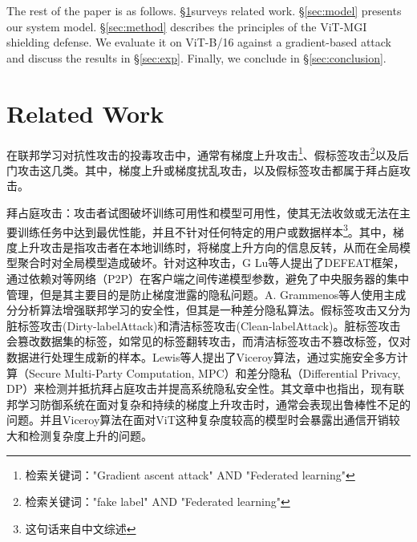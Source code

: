 \documentclass[conference]{IEEEtran}
\begin{document}
The rest of the paper is as follows. \hyperref[sec:related]{§\ref{sec:related}}surveys related work. \hyperref[sec:model]{§\ref{sec:model}} presents our system model. \hyperref[sec:method]{§\ref{sec:method}} describes the principles of the ViT-MGI shielding defense. We evaluate it on ViT-B/16 against a gradient-based attack and discuss the results in \hyperref[sec:exp]{§\ref{sec:exp}}. Finally, we conclude in \hyperref[sec:conclusion]{§\ref{sec:conclusion}}.






\section{Related Work}
\label{sec:related}

在联邦学习对抗性攻击的投毒攻击中，通常有梯度上升攻击\cite{gradientAscentAttack}\footnote{检索关键词："Gradient ascent attack" AND "Federated learning"}、假标签攻击\cite{fakeLabelAttack}\footnote{检索关键词："fake label" AND "Federated learning"}以及后门攻击\cite{how2backdoor}这几类。其中，梯度上升或梯度扰乱攻击，以及假标签攻击都属于拜占庭攻击。

拜占庭攻击：攻击者试图破坏训练可用性和模型可用性，使其无法收敛或无法在主要训练任务中达到最优性能，并且不针对任何特定的用户或数据样本\footnote{这句话来自中文综述\cite{chineseSurveyOnAttackAndDefense}}。其中，梯度上升攻击是指攻击者在本地训练时，将梯度上升方向的信息反转，从而在全局模型聚合时对全局模型造成破坏\cite{gradientAscentAttack}。针对这种攻击，G Lu等人提出了DEFEAT框架\cite{gradientAscentAttack_privacy}，通过依赖对等网络（P2P）在客户端之间传递模型参数，避免了中央服务器的集中管理，但是其主要目的是防止梯度泄露的隐私问题。A. Grammenos等人使用主成分分析算法增强联邦学习的安全性\cite{federatedPCA}，但其是一种差分隐私算法。假标签攻击又分为脏标签攻击(Dirty-labelAttack)\cite{latentAttack}和清洁标签攻击(Clean-labelAttack)\cite{cleanLabelAttack}。脏标签攻击会篡改数据集的标签，如常见的标签翻转攻击\cite{tailAttack_SuchAsLabelFlip}，而清洁标签攻击不篡改标签，仅对数据进行处理生成新的样本。Lewis等人提出了Viceroy算法\cite{gradientAscentAttackAndLabelFlip}，通过实施安全多方计算（Secure Multi-Party Computation, MPC）和差分隐私（Differential Privacy, DP）来检测并抵抗拜占庭攻击并提高系统隐私安全性。其文章中也指出，现有联邦学习防御系统在面对复杂和持续的梯度上升攻击时，通常会表现出鲁棒性不足的问题。并且Viceroy算法在面对ViT这种复杂度较高的模型时会暴露出通信开销较大和检测复杂度上升的问题。
\end{document}
